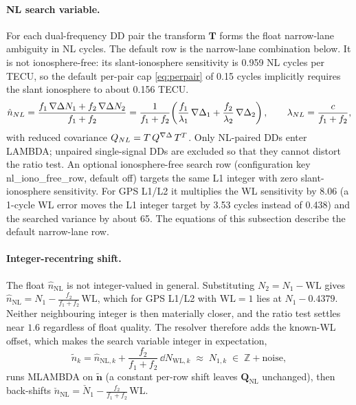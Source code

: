 \documentclass[main.tex]{subfiles}
\begin{document}
\paragraph{NL search variable.}
For each dual-frequency DD pair the transform $\bm{T}$ forms the float
narrow-lane ambiguity in NL cycles.  The default row is the narrow-lane
combination below.  It is not ionosphere-free: its slant-ionosphere
sensitivity is 0.959 NL cycles per TECU, so the default per-pair cap
\eqref{eq:perpair} of 0.15 cycles implicitly requires the slant
ionosphere to about 0.156 TECU.
\begin{equation}
\hat{n}_{NL}
= \frac{f_1\,\nabla\Delta N_1 + f_2\,\nabla\Delta N_2}{f_1 + f_2}
= \frac{1}{f_1 + f_2}\!\left(
    \frac{f_1}{\lambda_1}\,\nabla\Delta_1 + \frac{f_2}{\lambda_2}\,\nabla\Delta_2
  \right),
\qquad
\lambda_{NL} = \frac{c}{f_1 + f_2},
\label{eq:nl-float}
\end{equation}
with reduced covariance $Q_{NL} = T\,Q^{\nabla\Delta}\,
T^{T}$.  Only NL-paired DDs enter \textsc{LAMBDA}; unpaired
single-signal DDs are excluded so that they cannot distort the ratio
test.  An optional ionosphere-free search row (configuration key
nl\_iono\_free\_row, default off) targets the same L1 integer with zero
slant-ionosphere sensitivity.  For GPS L1/L2 it multiplies the WL
sensitivity by 8.06 (a 1-cycle WL error moves the L1 integer target by
3.53 cycles instead of 0.438) and the searched variance by about 65.
The equations of this subsection describe the default narrow-lane row.

\paragraph{Integer-recentring shift.}
The float $\hat{n}_{\mathrm{NL}}$ is not integer-valued in general.
Substituting $N_2 = N_1 - \mathrm{WL}$ gives
$\hat{n}_{\mathrm{NL}} = N_1 - \tfrac{f_2}{f_1+f_2}\,\mathrm{WL}$, which
for GPS L1/L2 with $\mathrm{WL} = 1$ lies at $N_1 - 0.4379$.  Neither
neighbouring integer is then materially closer, and the ratio test settles
near $1.6$ regardless of float quality.  The resolver therefore adds the
known-WL offset, which makes the search variable integer in
expectation,
\begin{equation}
\tilde{n}_k
= \hat{n}_{\mathrm{NL},k} + \frac{f_2}{f_1 + f_2}\,\dd N_{\mathrm{WL},k}
\;\approx\; N_{1,k} \;\in\; \mathbb{Z} + \text{noise},
\label{eq:nl-shift}
\end{equation}
runs \textsc{MLAMBDA} on $\tilde{\bm{n}}$ (a constant per-row shift
leaves $\bm{Q}_{\mathrm{NL}}$ unchanged), then back-shifts
$\check{n}_{\mathrm{NL}} = \check{N}_1 -
\tfrac{f_2}{f_1+f_2}\,\mathrm{WL}$.
\end{document}
